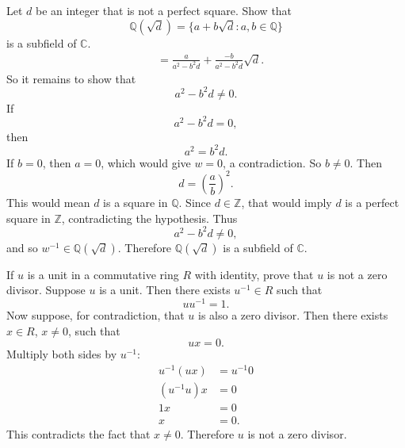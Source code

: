 \begin{problem}{
    Let $d$ be an integer that is not a perfect square.
    Show that
    \[
        \mathbb{Q}\left(\sqrt{d}\right)=\{a+b\sqrt{d}:a,b\in\mathbb{Q}\}
    \]
    is a subfield of $\mathbb{C}$.
}
\begin{align*}
        &=
        \frac{a}{a^2-b^{2}d}+\frac{-b}{a^2-b^{2}d}\sqrt{d}.
    \end{align*}
    So it remains to show that
    \[
        a^2-b^{2}d\neq 0.
    \]
    If
    \[
        a^2-b^{2}d=0,
    \]
    then
    \[
        a^2=b^{2}d.
    \]
    If $b=0$, then $a=0$, which would give $w=0$, a contradiction.
    So $b\neq 0$.
    Then
    \[
        d=\left(\frac{a}{b}\right)^2.
    \]
    This would mean $d$ is a square in $\mathbb{Q}$.
    Since $d\in\mathbb{Z}$, that would imply $d$ is a perfect square in $\mathbb{Z}$, contradicting the hypothesis.
    Thus
    \[
        a^2-b^{2}d\neq 0,
    \]
    and so $w^{-1}\in\mathbb{Q}\left(\sqrt{d}\right)$.
    Therefore $\mathbb{Q}\left(\sqrt{d}\right)$ is a subfield of $\mathbb{C}$.
\end{problem}

\begin{problem}{
    If $u$ is a unit in a commutative ring $R$ with identity, prove that $u$ is not a zero divisor.
}
    Suppose $u$ is a unit.
    Then there exists $u^{-1}\in R$ such that
    \[
        uu^{-1}=1.
    \]
    Now suppose, for contradiction, that $u$ is also a zero divisor.
    Then there exists $x\in R$, $x\neq 0$, such that
    \[
        ux=0.
    \]
    Multiply both sides by $u^{-1}$:
    \begin{align*}
        u^{-1}(ux) &= u^{-1}0\\
        (u^{-1}u)x &= 0\\
        1x &= 0\\
        x &= 0.
    \end{align*}
    This contradicts the fact that $x\neq 0$.
    Therefore $u$ is not a zero divisor.
\end{problem}

